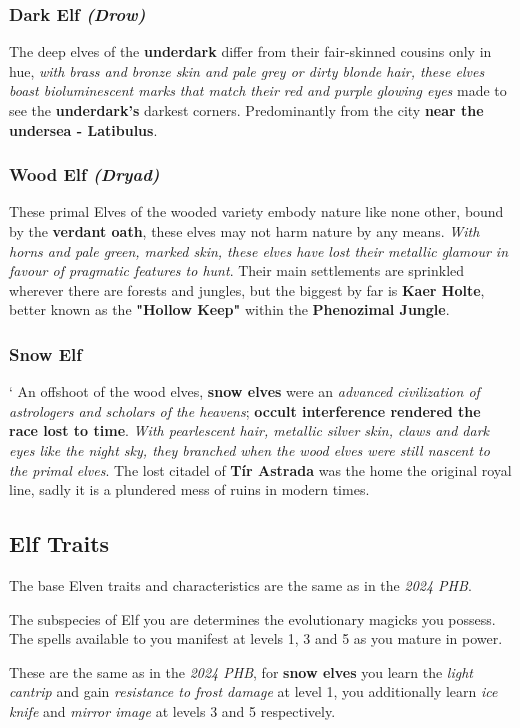\documentclass{apotheosis-book}
\begin{document}
\subsubsection{Dark Elf \textit{(Drow)}}
The deep elves of the\textbf{ underdark} differ from their fair-skinned cousins only in hue, \textit{with brass and bronze skin and pale grey or dirty blonde hair, these elves boast bioluminescent marks that match their red and purple glowing eyes} made to see the \textbf{underdark's} darkest corners. Predominantly from the city \textbf{near the undersea - Latibulus}.

\subsubsection{Wood Elf \textit{(Dryad)}}
These primal Elves of the wooded variety embody nature like none other, bound by the \textbf{verdant oath}, these elves may not harm nature by any means. \textit{With horns and pale green, marked skin, these elves have lost their metallic glamour in favour of pragmatic features to hunt}. Their main settlements are sprinkled wherever there are forests and jungles, but the biggest by far is \textbf{Kaer Holte}, better known as the \textbf{"Hollow Keep"} within the \textbf{Phenozimal Jungle}.

\subsubsection{Snow Elf}`
An offshoot of the wood elves, \textbf{snow elves} were an \textit{advanced civilization of astrologers and scholars of the heavens}; \textbf{occult interference rendered the race lost to time}. \textit{With pearlescent hair, metallic silver skin, claws and dark eyes like the night sky, they branched when the wood elves were still nascent to the primal elves}. The lost citadel of \textbf{Tír Astrada} was the home the original royal line, sadly it is a plundered mess of ruins in modern times.

\subsection{Elf Traits}
The base Elven traits and characteristics are the same as in the \textit{2024 PHB}.

The subspecies of Elf you are determines the evolutionary magicks you possess. The spells available to you manifest at levels 1, 3 and 5 as you mature in power.

These are the same as in the \textit{2024 PHB}, for \textbf{snow elves} you learn the \textit{light cantrip} and gain \textit{resistance to frost damage} at level 1, you additionally learn \textit{ice knife} and \textit{mirror image} at levels 3 and 5 respectively. 
\end{document}

